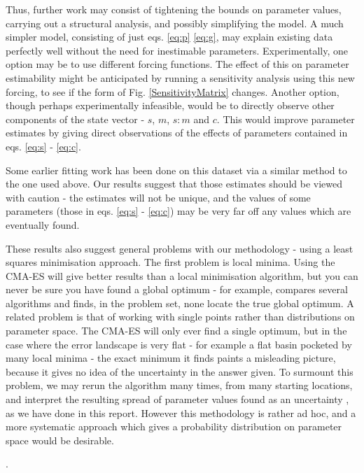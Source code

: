 \documentclass[10pt,journal]{./IEEE_latex_class/IEEEtran}
\begin{document}
 Thus, further work may consist of tightening the bounds on parameter values, carrying out a structural analysis, and possibly simplifying the model. A much simpler model, consisting of  just eqs. \ref{eq:p} \ref{eq:g}, may explain existing data perfectly well without the need for inestimable parameters. Experimentally, one option  may be to use different forcing functions. The effect of this on parameter estimability might be anticipated by running a sensitivity analysis using this new forcing, to see if the form of Fig. \ref{SensitivityMatrix} changes. Another option, though perhaps experimentally infeasible, would be to directly observe other components of the state vector - $s$, $m$, $s:m$ and $c$. This would improve parameter estimates by giving direct observations of the effects of parameters contained in eqs. \ref{eq:s} - \ref{eq:c}.

Some earlier fitting work has been done on this dataset via a similar method to the one used above. Our results suggest that those estimates should be viewed with caution - the estimates will not be unique, and the values of some parameters (those in eqs. \ref{eq:s} - \ref{eq:c}) may be very far off any values which are eventually found.

These results also suggest general problems with our methodology - using a least squares minimisation approach. The first problem is local minima. Using the CMA-ES will give better results than a local minimisation algorithm, but you can never be sure you have found a global optimum - for example, \cite{Algorithms2003} compares several algorithms and finds, in the problem set, none locate the true global optimum. A related problem is that of working with single points rather than distributions on parameter space. The CMA-ES will only ever find a single optimum, but in the case where the error landscape is very flat -  for example a flat basin pocketed by many local minima - the exact minimum it finds paints a misleading picture, because it gives no idea of the uncertainty in the answer given. To surmount this problem, we may rerun the algorithm many times, from many starting locations, and interpret the resulting spread of parameter values found as an uncertainty \cite{Hu2015}, as we have done in this report. However this methodology is rather ad hoc, and a more systematic approach which gives a probability distribution on parameter space would be desirable.

.




\end{document}
